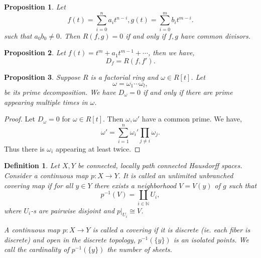 \documentclass{article}
\newtheorem{proposition}{Proposition}[section]
\newtheorem{definition}{Definition}[section]
\newcommand{\N}[0]{\mathbb{N}}
\begin{document}
\begin{proposition}
  Let 
  \begin{equation*}
    f(t) = \sum_{i=0}^n a_it^{n-i},g(t) = \sum_{i=0}^m b_it^{m-i}.
  \end{equation*}
  such that $a_0b_0\not=0$. Then $R(f,g) = 0$ if and only if $f,g$ have common divisors.
\end{proposition}

\begin{proposition}
  Let $f(t) = t^m+a_1t^{m-1}+\cdots$, then we have,
  \begin{equation*}
    D_f = R(f,f').
  \end{equation*}
\end{proposition}

\begin{proposition}
  \label{propositino_2_3}
  Suppose $R$ is a factorial ring and $\omega\in R[t]$. Let
  \begin{equation*}
    \omega=\omega_1\cdots\omega_l,
  \end{equation*}
  be its prime decomposition. We have $D_\omega=0$ if and only if there are prime appearing multiple times in $\omega$.
\end{proposition}

\begin{proof}
  Let $D_\omega=0$ for $\omega\in R[t]$. Then $\omega,\omega'$ have a common prime. We have,
  \begin{equation*}
    \omega' = \sum_{i=1}^n \omega_i'\prod_{j\not=i}\omega_j.
  \end{equation*}
  Thus there is $\omega_i$ appearing at least twice.
\end{proof}

\begin{definition}
  Let $X,Y$ be connected, locally path connected Hausdorff spaces. 
  Consider a continuous map $p:X\to Y$. It is called an unlimited unbranched covering map if for all $y\in Y$ there exists a neighborhood $V=V(y)$ of $g$ such that 
  \begin{equation*}
    p^{-1}(V) = \coprod_{i\in\N}U_i,
  \end{equation*}
  where $U_i$-s are pairwise disjoint and $p|_{U_i}\cong V$.
  \par A continuous map $p:X\to Y$ is called a covering if it is discrete (ie. each fiber is discrete) and open in the discrete topology, $p^{-1}(\{y\})$ is an isolated points.
  We call the cardinality of $p^{-1}(\{y\})$ the number of sheets.
\end{definition}
\end{document}
